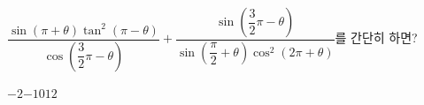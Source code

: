 $\dfrac{\sin(\pi+\theta)\tan^2(\pi-\theta)}{\cos\left(\dfrac{3}{2}\pi-\theta\right)}+\dfrac{\sin\left(\dfrac{3}{2}\pi-\theta\right)}{\sin\left(\dfrac{\pi}{2}+\theta\right)\cos^2(2\pi+\theta)}$를 간단히 하면?
\begin{choices32}{$-2$}{$-1$}{$0$}{$1$}{$2$}\end{choices32}

